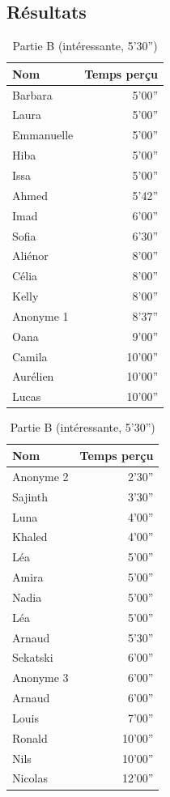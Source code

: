 \documentclass[12pt,fleqn,oneside,french,openany]{book} %
\begin{document}

\subsection{Résultats} \label{ssec:resultats1}

\begin{table}[h!]
\centering
\begin{minipage}[t]{.49\textwidth}
    \caption{Partie A (ennuyeuse, 5'20'')} \label{tbl:exp1.1A}
	\begin{tabular}{lr}
		\toprule 
		\textbf{Nom} & \textbf{Temps perçu}\\ \midrule
		Barbara & 5'00'' \\
		Laura & 5'00'' \\
		Emmanuelle & 5'00'' \\
		Hiba & 5'00'' \\
		Issa & 5'00'' \\
		Ahmed & 5'42'' \\
		Imad & 6'00'' \\
		Sofia & 6'30'' \\
		Aliénor & 8'00'' \\
		Célia & 8'00'' \\
		Kelly & 8'00'' \\
		Anonyme 1 & 8'37'' \\
		Oana & 9'00'' \\
		Camila & 10'00'' \\
		Aurélien & 10'00'' \\
		Lucas & 10'00'' \\ \bottomrule
	\end{tabular}
\end{minipage}
\hfill
\begin{minipage}[t]{.49\textwidth}
	\caption{Partie B (intéressante, 5'30'')} \label{tbl:exp1.1B}
    \begin{tabular}{lr}
		\toprule
		\textbf{Nom} & \textbf{Temps perçu} \\ \midrule
		Anonyme 2 & 2'30'' \\
		Sajinth & 3'30'' \\
		Luna & 4'00'' \\
		Khaled & 4'00'' \\
		Léa & 5'00'' \\
		Amira & 5'00'' \\
		Nadia & 5'00'' \\
		Léa & 5'00'' \\
		Arnaud & 5'30'' \\
		Sekatski & 6'00'' \\
		Anonyme 3 & 6'00'' \\
		Arnaud & 6'00'' \\
		Louis & 7'00'' \\
		Ronald & 10'00'' \\
		Nils & 10'00'' \\
		Nicolas & 12'00'' \\ \bottomrule
	\end{tabular}
\end{minipage}
\end{table}
\end{document}
